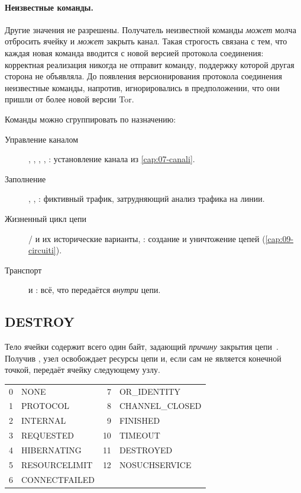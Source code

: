 \paragraph{Неизвестные команды.} Другие значения не разрешены. Получатель неизвестной команды \emph{может} молча отбросить ячейку и \emph{может} закрыть канал. Такая строгость связана с тем, что каждая новая команда вводится с новой версией протокола соединения: корректная реализация никогда не отправит команду, поддержку которой другая сторона не объявляла. До появления версионирования протокола соединения неизвестные команды, напротив, игнорировались в предположении, что они пришли от более новой версии Tor.

Команды можно сгруппировать по назначению:
\begin{description}
  \item[Управление каналом] , , , , : установление канала из \cref{cap:07-canali}.
  \item[Заполнение] , , : фиктивный трафик, затрудняющий анализ трафика на линии.
  \item[Жизненный цикл цепи] / и их исторические варианты, : создание и уничтожение цепей (\cref{cap:09-circuiti}).
  \item[Транспорт]  и : всё, что передаётся \emph{внутри} цепи.
\end{description}

\subsection{DESTROY}

Тело ячейки  содержит всего один байт, задающий \emph{причину} закрытия цепи~. Получив , узел освобождает ресурсы цепи и, если сам не является конечной точкой, передаёт ячейку  следующему узлу.

\begin{center}\small
\begin{tabular}{rl@{\qquad}rl}
\toprule
0 & NONE & 7 & OR\_IDENTITY \\
1 & PROTOCOL & 8 & CHANNEL\_CLOSED \\
2 & INTERNAL & 9 & FINISHED \\
3 & REQUESTED & 10 & TIMEOUT \\
4 & HIBERNATING & 11 & DESTROYED \\
5 & RESOURCELIMIT & 12 & NOSUCHSERVICE \\
6 & CONNECTFAILED & & \\
\bottomrule
\end{tabular}
\end{center}

